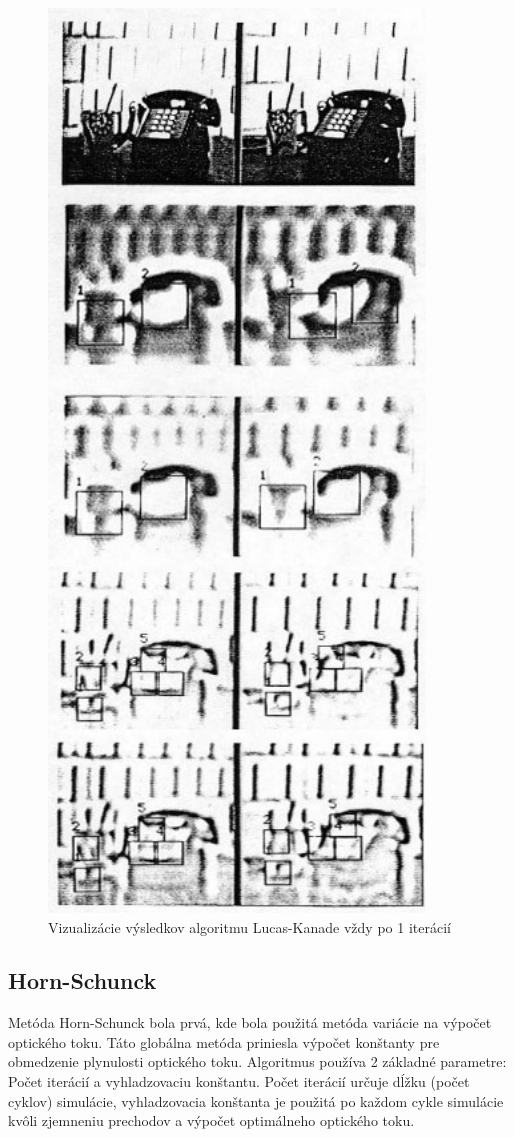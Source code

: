 \begin{figure}[H]
  \centering
  \includegraphics[width=10cm]{pics/lukas-kanade.jpg}
  \caption{Vizualizácie výsledkov algoritmu Lucas-Kanade vždy po 1 iterácií\cite{lucas-kanade}}
\end{figure}
\vspace{10mm}

\subsection{Horn-Schunck}
Metóda Horn-Schunck bola prvá, kde bola použitá metóda variácie na výpočet optického toku.
Táto globálna metóda priniesla výpočet  konštanty pre obmedzenie plynulosti optického toku.
Algoritmus používa 2 základné parametre: Počet iterácií a vyhladzovaciu konštantu.
Počet iterácií určuje dĺžku (počet cyklov) simulácie, vyhladzovacia konštanta je použitá po každom cykle simulácie kvôli zjemneniu prechodov a výpočet optimálneho optického toku.

